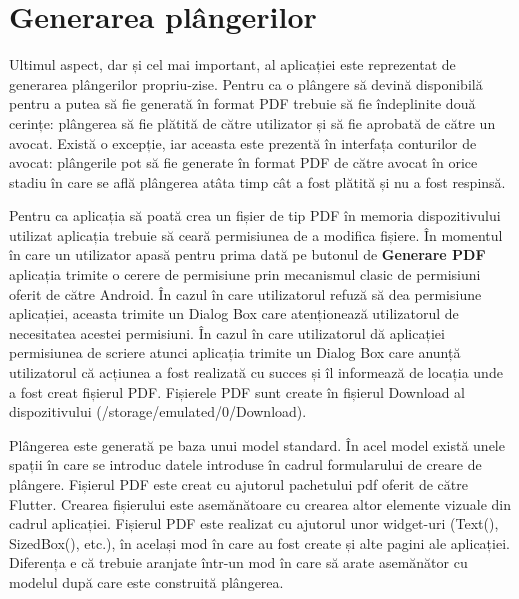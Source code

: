 \documentclass[12pt,a4paper]{report}
\theoremstyle{definition}
\theoremstyle{remark}
\begin{document}
\section{Generarea plângerilor}
Ultimul aspect, dar și cel mai important, al aplicației este reprezentat de generarea plângerilor propriu-zise. Pentru ca o plângere să devină disponibilă pentru a putea să fie generată în format PDF trebuie să fie îndeplinite două cerințe: plângerea să fie plătită de către utilizator și să fie aprobată de către un avocat. Există o excepție, iar aceasta este prezentă în interfața conturilor de avocat: plângerile pot să fie generate în format PDF de către avocat în orice stadiu în care se află plângerea atâta timp cât a fost plătită și nu a fost respinsă.

Pentru ca aplicația să poată crea un fișier de tip PDF în memoria dispozitivului utilizat aplicația trebuie să ceară permisiunea de a modifica fișiere. În momentul în care un utilizator apasă pentru prima dată pe butonul de \textbf{Generare PDF} aplicația trimite o cerere de permisiune prin mecanismul clasic de permisiuni oferit de către Android. În cazul în care utilizatorul refuză să dea permisiune aplicației, aceasta trimite un Dialog Box care atenționează utilizatorul de necesitatea acestei permisiuni. În cazul în care utilizatorul dă aplicației permisiunea de scriere atunci aplicația trimite un Dialog Box care anunță utilizatorul că acțiunea a fost realizată cu succes și îl informează de locația unde a fost creat fișierul PDF. Fișierele PDF sunt create în fișierul Download al dispozitivului (/storage/emulated/0/Download).

Plângerea este generată pe baza unui model standard. În acel model există unele spații în care se introduc datele introduse în cadrul formularului de creare de plângere. Fișierul PDF este creat cu ajutorul pachetului pdf oferit de către Flutter. Crearea fișierului este asemănătoare cu crearea altor elemente vizuale din cadrul aplicației. Fișierul PDF este realizat cu ajutorul unor widget-uri (Text(), SizedBox(), etc.), în același mod în care au fost create și alte pagini ale aplicației. Diferența e că trebuie aranjate într-un mod în care să arate asemănător cu modelul după care este construită plângerea.
\end{document}
